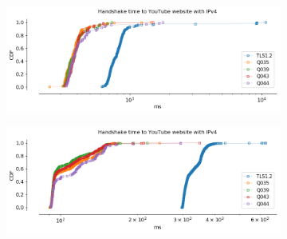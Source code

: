 \begin{frame}

\begin{figure}[!htb]
    
    \begin{subfigure}{0.5\textwidth}
        \includegraphics[width=\linewidth]{./plots/youtube/india/graph_website_connect_time.png}
    \end{subfigure}
    \begin{subfigure}{0.5\textwidth}
        \includegraphics[width=\linewidth]{./plots/youtube/munich/graph_website_connect_time.png}
    \end{subfigure}    
    \caption{}
\end{figure}

\end{frame}
\clearpage

